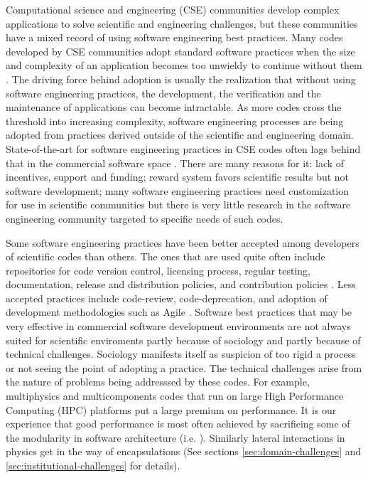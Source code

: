 \label{sec:introduction}
Computational science and engineering (CSE) communities develop
complex applications to solve scientific and engineering challenges,
but these communities have a mixed record of using software
engineering best practices. Many codes developed by CSE communities
adopt standard software practices when the size and complexity of an
application becomes too unwieldy to continue without them
\cite{cc2012}. The driving force behind adoption is usually the
realization that without using software engineering practices, the
development, the verification and the maintenance of applications can become
intractable. As more codes cross the threshold into increasing
complexity, software engineering processes are being adopted from
practices derived outside of the scientific and engineering domain.
State-of-the-art for software engineering practices in CSE codes often lags
behind that in the commercial software space
\cite{segal2008developing,basili2008understanding, hochstein2008asc}. 
There are many reasons for it: lack of incentives, support and
funding; reward system favors scientific results but not software 
development; many software engineering practices need customization
for use in scientific communities but there is very little
research in the software engineering community targeted to specific
needs of such codes. 

Some software engineering practices have been better accepted 
among developers of scientific codes than others. The ones that are
used quite often include repositories for code version control,
licensing process, regular testing, documentation, release and distribution
policies, and contribution policies \cite{cc2012, carver2012software,
Dubey2014}. Less accepted practices include code-review,
code-deprecation, and adoption of development methodologies such as
Agile \cite{agile}. Software best practices that may be very effective in commercial
software development environments are not always suited for scientific
enviroments partly because of sociology and partly because of technical
challenges. Sociology manifests itself as suspicion of too rigid a
process or not seeing the point of adopting a practice. The
technical challenges arise from the nature of problems being addresssed by
these codes. For example, multiphysics and multicomponents  
codes that run on large High Performance Computing 
(HPC) platforms put a large premium on performance. It is our
experience that good performance is most often achieved by sacrificing
some of the modularity in software architecture
(i.e. \cite{Dubey1999}). Similarly lateral interactions in physics get
in the way of encapsulations (See sections \ref{sec:domain-challenges}
and \ref{sec:institutional-challenges} for details).

